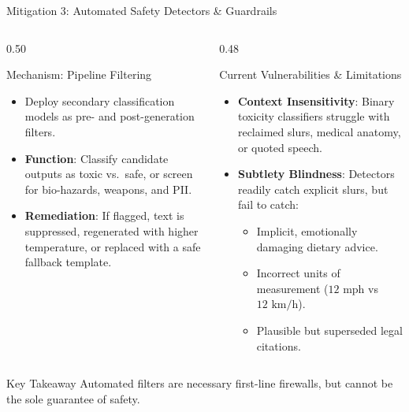 \documentclass[aspectratio=169, 10pt]{beamer}
\begin{document}
\begin{frame}{Mitigation 3: Automated Safety Detectors \& Guardrails}
  \begin{columns}[T]
    \begin{column}{0.50\textwidth}
      \begin{block}{Mechanism: Pipeline Filtering}
        \begin{itemize}
          \item Deploy secondary classification models as pre- and post-generation filters.
          \item \textbf{Function}: Classify candidate outputs as toxic vs.\ safe, or screen for bio-hazards, weapons, and PII.
          \item \textbf{Remediation}: If flagged, text is suppressed, regenerated with higher temperature, or replaced with a safe fallback template.
        \end{itemize}
      \end{block}
    \end{column}

    \begin{column}{0.48\textwidth}
      \begin{alertbox}{Current Vulnerabilities \& Limitations}
        \begin{itemize}
          \item \textbf{Context Insensitivity}: Binary toxicity classifiers struggle with reclaimed slurs, medical anatomy, or quoted speech.
          \item \textbf{Subtlety Blindness}: Detectors readily catch explicit slurs, but fail to catch:
          \begin{itemize}
            \item Implicit, emotionally damaging dietary advice.
            \item Incorrect units of measurement ($12\text{ mph}$ vs $12\text{ km/h}$).
            \item Plausible but superseded legal citations.
          \end{itemize}
        \end{itemize}
      \end{alertbox}
    \end{column}
  \end{columns}

  \vskip 3mm
  \begin{exampleblock}{Key Takeaway}
    Automated filters are necessary first-line firewalls, but cannot be the sole guarantee of safety.
  \end{exampleblock}
\end{frame}
\end{document}
